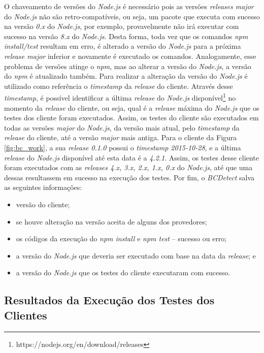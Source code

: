 O chaveamento de versões do \textit{Node.js} é necessário pois as versões \textit{releases major} do \textit{Node.js} não são retro-compatíveis, ou seja, um pacote que executa com sucesso na versão \textit{0.x} do \textit{Node.js}, por exemplo, provavelmente não irá executar com sucesso na versão \textit{8.x} do \textit{Node.js}. Desta forma, toda vez que os comandos \textit{npm install/test} resultam em erro, é alterado a versão do \textit{Node.js} para a próxima \textit{release major} inferior e novamente é executado os comandos. Analogamente, esse problema de versões atinge o \textit{npm}, mas ao alterar a versão do \textit{Node.js}, a versão do \textit{npm} é atualizado também. Para realizar a alteração da versão do \textit{Node.js} é utilizado como referência o \textit{timestamp} da \textit{release} do cliente. Através desse \textit{timestamp}, é possível identificar a última \textit{release} do \textit{Node.js} disponível\footnote{https://nodejs.org/en/download/releases} no momento da \textit{release} do cliente, ou seja, qual é a \textit{release} máxima do \textit{Node.js} que os testes dos cliente foram executados. Assim, os testes do cliente são executados em todas as versões \textit{major} do \textit{Node.js}, da versão mais atual, pelo \textit{timestamp} da \textit{release} do cliente, até a versão \textit{major} mais antiga. Para o cliente da Figura \ref{fig:bc_work}, a sua \textit{release 0.1.0} possui o \textit{timestamp 2015-10-28}, e a última \textit{release} do \textit{Node.js} disponível até esta data é a \textit{4.2.1}. Assim, os testes desse cliente foram executados com as \textit{releases 4.x, 3.x, 2.x, 1.x, 0.x} do \textit{Node.js}, até que uma dessas resultassem em sucesso na execução dos testes. Por fim, o \textit{BCDetect} salva as seguintes informações:

\begin{itemize}
    \item versão do cliente;
    \item se houve alteração na versão aceita de alguns dos provedores;
    \item os códigos da execução do \textit{npm install} e \textit{npm test} -- sucesso ou erro;
    \item a versão do \textit{Node.js} que deveria ser executado com base na data da \textit{release}; e
    \item a versão do \textit{Node.js} que os testes do cliente executaram com sucesso.
\end{itemize}{}

\subsection{Resultados da Execução dos Testes dos Clientes}
\label{sec:col_dados}

